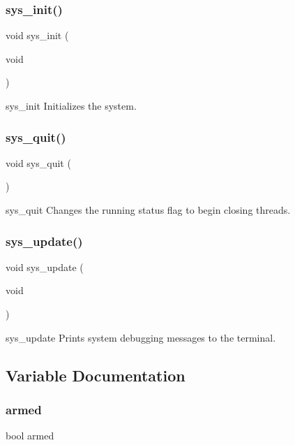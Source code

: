 \subsubsection{sys\+\_\+init()}
{\footnotesize\ttfamily void sys\+\_\+init (\begin{DoxyParamCaption}\item[{void}]{ }\end{DoxyParamCaption})}

sys\+\_\+init Initializes the system. \mbox{\label{sys_8h_a7452240234dccdd008b189f22ad70469}} 
\subsubsection{sys\+\_\+quit()}
{\footnotesize\ttfamily void sys\+\_\+quit (\begin{DoxyParamCaption}{ }\end{DoxyParamCaption})}

sys\+\_\+quit Changes the \textquotesingle{}running\textquotesingle{} status flag to begin closing threads. \mbox{\label{sys_8h_aa21074a5e744e59d10aa2ae116479031}} 
\subsubsection{sys\+\_\+update()}
{\footnotesize\ttfamily void sys\+\_\+update (\begin{DoxyParamCaption}\item[{void}]{ }\end{DoxyParamCaption})}

sys\+\_\+update Prints system debugging messages to the terminal. 

\subsection{Variable Documentation}
\mbox{\label{sys_8h_a95a7a3c9dec5f98703b42898ccd417a1}} 
\subsubsection{armed}
{\footnotesize\ttfamily bool armed}

\mbox{\label{sys_8h_a36f7b6be7108281af77939ceaec42fd6}} 

